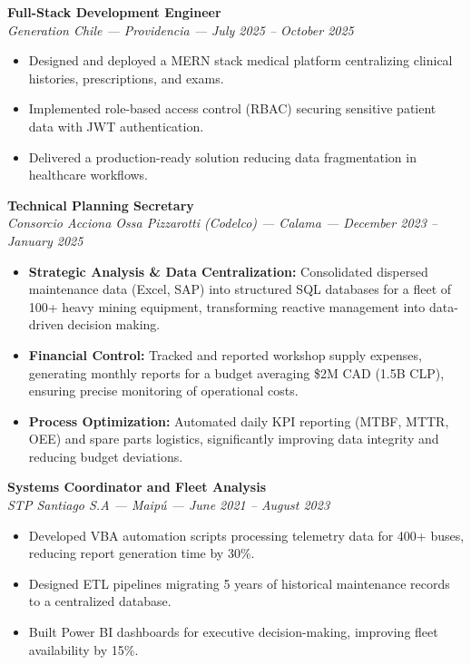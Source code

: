\documentclass[10pt,letterpaper]{article}
\begin{document}
\noindent \textbf{Full-Stack Development Engineer} \\
\textit{Generation Chile — Providencia — July 2025 – October 2025}
\begin{itemize}
    \item Designed and deployed a MERN stack medical platform centralizing clinical histories, prescriptions, and exams.
    \item Implemented role-based access control (RBAC) securing sensitive patient data with JWT authentication.
    \item Delivered a production-ready solution reducing data fragmentation in healthcare workflows.
\end{itemize}

\vspace{0.2cm}

\noindent \textbf{Technical Planning Secretary} \\
\textit{Consorcio Acciona Ossa Pizzarotti (Codelco) — Calama — December 2023 – January 2025}
\begin{itemize}
    \item \textbf{Strategic Analysis \& Data Centralization:} Consolidated dispersed maintenance data (Excel, SAP) into structured SQL databases for a fleet of 100+ heavy mining equipment, transforming reactive management into data-driven decision making.
    \item \textbf{Financial Control:} Tracked and reported workshop supply expenses, generating monthly reports for a budget averaging \$2M CAD (1.5B CLP), ensuring precise monitoring of operational costs.
    \item \textbf{Process Optimization:} Automated daily KPI reporting (MTBF, MTTR, OEE) and spare parts logistics, significantly improving data integrity and reducing budget deviations.
\end{itemize}

\vspace{0.2cm}

\noindent \textbf{Systems Coordinator and Fleet Analysis} \\
\textit{STP Santiago S.A — Maipú — June 2021 – August 2023}
\begin{itemize}
    \item Developed VBA automation scripts processing telemetry data for 400+ buses, reducing report generation time by 30\%.
    \item Designed ETL pipelines migrating 5 years of historical maintenance records to a centralized database.
    \item Built Power BI dashboards for executive decision-making, improving fleet availability by 15\%.
\end{itemize}
\end{document}
